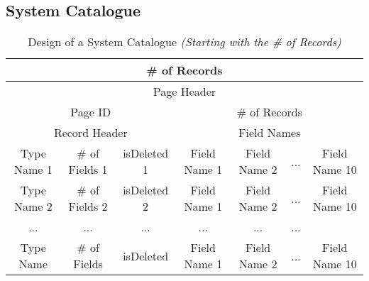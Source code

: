 \documentclass{article}
\begin{document}
    \subsection{System Catalogue}
               
                \begin{table}[h!]
                \begin{center}
                    \begin{tabular}{ | c | c | c | c | c | c | c | }
                    \hline
                        \multicolumn{7}{||c|}{\# of Records} \\
                    \hline
                    \hline
                        \multicolumn{7}{||c|}{Page Header} \\
                    \hline
                    \hline
                        \multicolumn{3}{||c|}{Page ID} &
                        \multicolumn{4}{|c||}{\# of Records} \\
                    \hline
                    \hline
                        \multicolumn{3}{||c|}{Record Header} &
                        \multicolumn{4}{|c||}{Field Names} \\
                    \hline
                    \hline
                    Type Name 1 & \# of Fields  1 & isDeleted 1 & Field Name 1  & Field Name 2 & ... & Field Name 10 \\
                    \hline
                    Type Name 2 & \# of Fields 2 & isDeleted 2 & Field Name 1 & Field Name 2 & ... & Field Name 10 \\
                    \hline
                    ... & ... & ... & ... & ... & ... \\
                    \hline
                    Type Name  & \# of Fields & isDeleted & Field Name 1 & Field Name 2 & ... & Field Name 10 \\
                    \hline
                    \end{tabular}
                \end{center}
            \caption{Design of a System Catalogue \emph{(Starting with the \# of Records)}}
            \label{table:1}
        \end{table}
\end{document}

